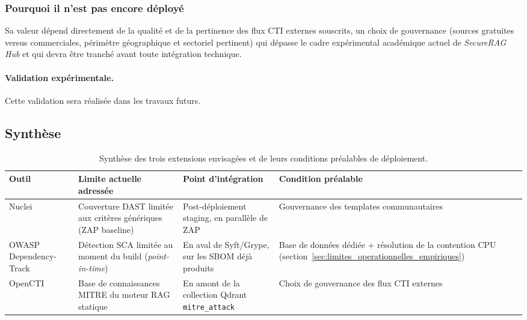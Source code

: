 \subsubsection{Pourquoi il n'est pas encore déployé}
Sa valeur dépend directement de la qualité et de la pertinence des flux CTI externes souscrits, un choix de gouvernance (sources gratuites versus commerciales, périmètre géographique et sectoriel pertinent) qui dépasse le cadre expérimental académique actuel de \textit{SecureRAG Hub} et qui devra être tranché avant toute intégration technique.

\paragraph{Validation expérimentale.} Cette validation sera réalisée dans les travaux futurs.


\subsection{Synthèse}

\begin{table}[H]
\centering
\scriptsize
\begin{tabular}{@{}p{2.6cm}p{5cm}p{3cm}p{3cm}@{}}
\toprule
\textbf{Outil} & \textbf{Limite actuelle adressée} & \textbf{Point d'intégration} & \textbf{Condition préalable} \\
\midrule
Nuclei & Couverture DAST limitée aux critères génériques (ZAP baseline) & Post-déploiement staging, en parallèle de ZAP & Gouvernance des templates communautaires \\
OWASP Dependency-Track & Détection SCA limitée au moment du build (\textit{point-in-time}) & En aval de Syft/Grype, sur les SBOM déjà produits & Base de données dédiée + résolution de la contention CPU (section~\ref{sec:limites_operationnelles_empiriques}) \\
OpenCTI & Base de connaissances MITRE du moteur RAG statique & En amont de la collection Qdrant \texttt{mitre\_attack} & Choix de gouvernance des flux CTI externes \\
\bottomrule
\end{tabular}
\caption{Synthèse des trois extensions envisagées et de leurs conditions préalables de déploiement.}
\label{tab:perspectives_outils_synthese}
\end{table}


